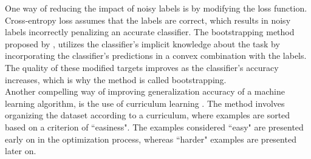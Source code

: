 One way of reducing the impact of noisy labels is by modifying the loss function. Cross-entropy loss assumes that the labels are correct, which results in noisy labels incorrectly penalizing an accurate classifier. The bootstrapping method proposed by \citep{Reed_noisy_labels_bootstrapping}, utilizes the classifier's implicit knowledge about the task by incorporating the classifier’s predictions in a convex combination with the labels. The quality of these modified targets improves as the classifier's accuracy increases, which is why the method is called bootstrapping.\\

Another compelling way of improving generalization accuracy of a machine learning algorithm, is the use of curriculum learning \citep{Bengio_curriculumlearning}. The method involves organizing the dataset according to a curriculum, where examples are sorted based on a criterion of ``easiness". The examples considered ``easy" are presented early on in the optimization process, whereas ``harder" examples are presented later on.
